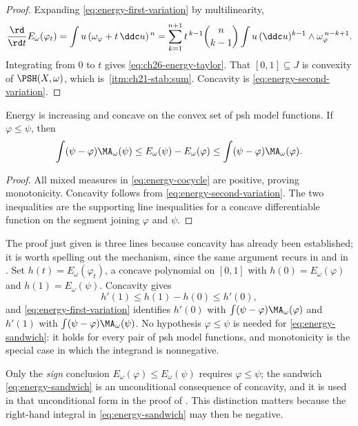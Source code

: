 \begin{proof}
Expanding \eqref{eq:energy-first-variation} by multilinearity,
\[
 \frac{\rd}{\rd t}E_\omega(\varphi_t)
 =\int u\,(\omega_\varphi+t\,\ddc u)^{\,n}
 =\sum_{k=1}^{n+1}t^{\,k-1}\binom{n}{k-1}
   \int u\,(\ddc u)^{k-1}\wedge\omega_\varphi^{\,n-k+1}.
\]
Integrating from $0$ to $t$ gives \eqref{eq:ch26-energy-taylor}.  That
$[0,1]\subseteq J$ is convexity of $\PSH(X,\omega)$, which is
\,\cref{itm:ch21-stab:sum}.  Concavity is
\eqref{eq:energy-second-variation}.
\end{proof}

\begin{corollary}\label{cor:energy-monotone-concave}
Energy is increasing and concave on the convex set of psh model functions.
If $\varphi\leq\psi$, then
\begin{equation}
\label{eq:energy-sandwich}
 \int(\psi-\varphi)\MA_\omega(\psi)
 \leq E_\omega(\psi)-E_\omega(\varphi)
 \leq\int(\psi-\varphi)\MA_\omega(\varphi).
\end{equation}
\end{corollary}

\begin{proof}
All mixed measures in \eqref{eq:energy-cocycle} are positive, proving
monotonicity. Concavity follows from
\eqref{eq:energy-second-variation}. The two inequalities are the supporting
line inequalities for a concave differentiable function on the segment
joining $\varphi$ and $\psi$.
\end{proof}

The proof just given is three lines because concavity has already been
established; it is worth spelling out the mechanism, since the same argument
recurs in  and in
.  Set
$h(t)=E_\omega(\varphi_t)$, a concave polynomial on $[0,1]$ with
$h(0)=E_\omega(\varphi)$ and $h(1)=E_\omega(\psi)$.  Concavity gives
\[
 h'(1)\leq h(1)-h(0)\leq h'(0),
\]
and \eqref{eq:energy-first-variation} identifies $h'(0)$ with
$\int(\psi-\varphi)\MA_\omega(\varphi)$ and $h'(1)$ with
$\int(\psi-\varphi)\MA_\omega(\psi)$.  No hypothesis $\varphi\leq\psi$ is
needed for \eqref{eq:energy-sandwich}: it holds for every pair of psh model
functions, and monotonicity is the special case in which the integrand is
nonnegative.

\begin{remark}
\label{rem:ch26-sandwich-scope}
Only the \emph{sign} conclusion $E_\omega(\varphi)\leq E_\omega(\psi)$
requires $\varphi\leq\psi$; the sandwich
\eqref{eq:energy-sandwich} is an unconditional consequence of concavity, and
it is used in that unconditional form in the proof of
.  This distinction matters because the
right-hand integral in \eqref{eq:energy-sandwich} may then be negative.
\end{remark}

